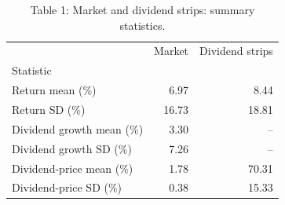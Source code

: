 \begin{table}
\caption{Table 1: Market and dividend strips: summary statistics.}
\label{tab:replication_1}
\begin{tabular}{lrr}
\toprule
 & Market & Dividend strips \\
Statistic &  &  \\
\midrule
Return mean (\%) & 6.97 & 8.44 \\
Return SD (\%) & 16.73 & 18.81 \\
Dividend growth mean (\%) & 3.30 & -- \\
Dividend growth SD (\%) & 7.26 & -- \\
Dividend-price mean (\%) & 1.78 & 70.31 \\
Dividend-price SD (\%) & 0.38 & 15.33 \\
\bottomrule
\end{tabular}
\end{table}

